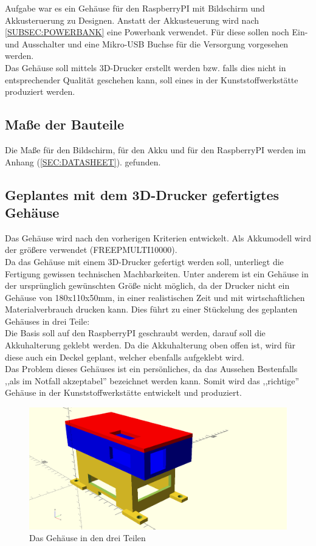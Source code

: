 \documentclass[12pt,a4paper]{article}
\begin{document}
{Aufgabe war es ein Gehäuse für den RaspberryPI mit Bildschirm und Akkusteruerung zu Designen. Anstatt der Akkusteuerung wird nach \ref{SUBSEC:POWERBANK} eine Powerbank verwendet. Für diese sollen noch Ein- und Ausschalter und eine Mikro-USB Buchse für die Versorgung vorgesehen werden. \\
Das Gehäuse soll mittels 3D-Drucker erstellt werden bzw. falls dies nicht in entsprechender Qualität geschehen kann, soll eines in der Kunststoffwerkstätte produziert werden.\\

\subsection{Maße der Bauteile}

Die Maße für den Bildschirm, für den Akku und für den RaspberryPI werden im Anhang  (\ref{SEC:DATASHEET}).
gefunden.

\subsection{Geplantes mit dem 3D-Drucker gefertigtes Gehäuse}

Das Gehäuse wird nach den vorherigen Kriterien entwickelt.  Als Akkumodell wird der größere verwendet (FREEPMULTI10000).\\
Da das Gehäuse mit einem 3D-Drucker gefertigt werden soll, unterliegt die Fertigung gewissen technischen Machbarkeiten. Unter anderem ist ein Gehäuse in der ursprünglich gewünschten Größe nicht möglich, da der Drucker nicht ein Gehäuse von 180x110x50mm, in einer realistischen Zeit und mit wirtschaftlichen Materialverbrauch drucken kann. Dies führt zu einer Stückelung des geplanten Gehäuses in drei Teile: \\
Die Basis soll auf den RaspberryPI geschraubt werden, darauf soll die Akkuhalterung geklebt werden. Da die Akkuhalterung oben offen ist, wird für diese auch ein Deckel geplant, welcher ebenfalls aufgeklebt wird. \\
Das Problem dieses Gehäuses ist ein persönliches, da das Aussehen Bestenfalls ,,als im Notfall akzeptabel'' bezeichnet werden kann. Somit wird das ,,richtige'' Gehäuse in der Kunststoffwerkstätte entwickelt und produziert. 

\begin{figure}[H]
  \centering
		\includegraphics[scale=0.6, angle=90]{graphics/gehaeuse.png}
		\caption{Das Gehäuse in den drei Teilen}
		\label{fig:case-3D}
\end{figure}

}
\end{document}
